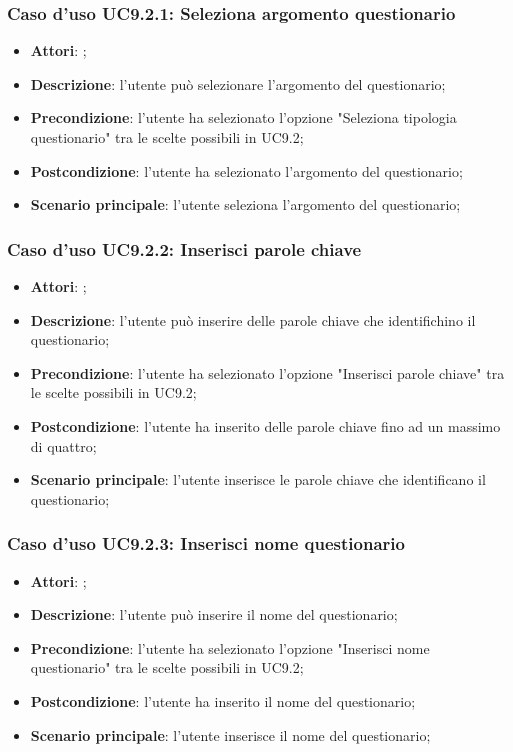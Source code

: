 		\subsubsection{Caso d'uso UC9.2.1: Seleziona argomento questionario}
		\label{UC9.2.1}
		\begin{itemize}
			\item \textbf{Attori}: \uaupro;
			\item \textbf{Descrizione}: l'utente può selezionare l'argomento del questionario; 
			\item \textbf{Precondizione}: l'utente ha selezionato l'opzione "Seleziona tipologia questionario" tra le scelte possibili in UC9.2;
			\item \textbf{Postcondizione}: l'utente ha selezionato l'argomento del questionario;
			\item \textbf{Scenario principale}: l'utente seleziona l'argomento del questionario;
		\end{itemize}
		
		\subsubsection{Caso d'uso UC9.2.2: Inserisci parole chiave}
		\label{UC9.2.2}
		\begin{itemize}
			\item \textbf{Attori}: \uaupro;
			\item \textbf{Descrizione}: l'utente può inserire delle parole chiave che identifichino il questionario; 
			\item \textbf{Precondizione}: l'utente ha selezionato l'opzione "Inserisci parole chiave" tra le scelte possibili in UC9.2;
			\item \textbf{Postcondizione}: l'utente ha inserito delle parole chiave fino ad un massimo di quattro; 
			\item \textbf{Scenario principale}: l'utente inserisce le parole chiave che identificano il questionario;
		\end{itemize}
			
		\subsubsection{Caso d'uso UC9.2.3: Inserisci nome questionario}
		\label{UC9.2.3}
		\begin{itemize}
			\item \textbf{Attori}: \uaupro;
			\item \textbf{Descrizione}: l'utente può inserire il nome del questionario; 
			\item \textbf{Precondizione}: l'utente ha selezionato l'opzione "Inserisci nome questionario" tra le scelte possibili in UC9.2;
			\item \textbf{Postcondizione}: l'utente ha inserito il nome del questionario; 
			\item \textbf{Scenario principale}: l'utente inserisce il nome del questionario;
		\end{itemize}
				
